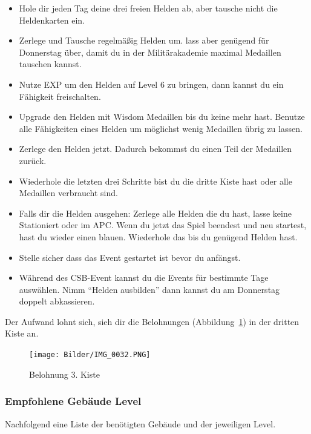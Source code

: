 \documentclass[fontsize=12pt,a4paper]{scrartcl}[2003/01/01]
\begin{document}
\begin{itemize}
  \item Hole dir jeden Tag deine drei freien Helden ab, aber tausche nicht die Heldenkarten ein.
  \item Zerlege und Tausche regelmäßig Helden um. lass aber genügend für Donnerstag über, damit du in der Militärakademie maximal Medaillen tauschen kannst.
  \item Nutze EXP um den Helden auf Level 6 zu bringen, dann kannst du ein Fähigkeit freischalten.
  \item Upgrade den Helden mit Wisdom Medaillen bis du keine mehr hast. Benutze alle Fähigkeiten eines Helden um möglichst wenig Medaillen übrig zu lassen.
  \item Zerlege den Helden jetzt. Dadurch bekommst du einen Teil der Medaillen zurück.
  \item Wiederhole die letzten drei Schritte bist du die dritte Kiste hast oder alle Medaillen verbraucht sind.
  \item Falls dir die Helden ausgehen: Zerlege alle Helden die du hast, lasse keine Stationiert oder im APC. 
        Wenn du jetzt das Spiel beendest und neu startest, hast du wieder einen blauen. Wiederhole das bis du genügend Helden hast.
  \item Stelle sicher dass das Event gestartet ist bevor du anfängst.
  \item Während des CSB-Event kannst du die Events für bestimmte Tage auswählen. Nimm "`Helden ausbilden"' dann kannst du am Donnerstag doppelt abkassieren.
\end{itemize}	

Der Aufwand lohnt sich, sieh dir die Belohnungen (Abbildung~\ref{fig:belohnung}) in der dritten Kiste an.

\begin{figure}[H] 
  \centering
     \texttt{[image: Bilder/IMG\_0032.PNG]}
  \caption{Belohnung 3. Kiste}
  \label{fig:belohnung}
\end{figure}



\subsubsection{Empfohlene Gebäude Level}

Nachfolgend eine Liste der benötigten Gebäude und der jeweiligen Level.
\end{document}
